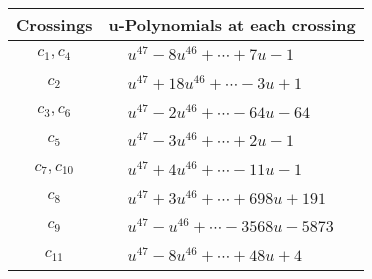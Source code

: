 \documentclass[1p]{elsarticle_modified}
\theoremstyle{definition}
\begin{document}
\begin{tabular}{m{50pt}|m{274pt}}
Crossings & \hspace{64pt}u-Polynomials at each crossing \\
\hline $$\begin{aligned}c_{1},c_{4}\end{aligned}$$&$\begin{aligned}
&u^{47}-8 u^{46}+\cdots+7 u-1
\end{aligned}$\\
\hline $$\begin{aligned}c_{2}\end{aligned}$$&$\begin{aligned}
&u^{47}+18 u^{46}+\cdots-3 u+1
\end{aligned}$\\
\hline $$\begin{aligned}c_{3},c_{6}\end{aligned}$$&$\begin{aligned}
&u^{47}-2 u^{46}+\cdots-64 u-64
\end{aligned}$\\
\hline $$\begin{aligned}c_{5}\end{aligned}$$&$\begin{aligned}
&u^{47}-3 u^{46}+\cdots+2 u-1
\end{aligned}$\\
\hline $$\begin{aligned}c_{7},c_{10}\end{aligned}$$&$\begin{aligned}
&u^{47}+4 u^{46}+\cdots-11 u-1
\end{aligned}$\\
\hline $$\begin{aligned}c_{8}\end{aligned}$$&$\begin{aligned}
&u^{47}+3 u^{46}+\cdots+698 u+191
\end{aligned}$\\
\hline $$\begin{aligned}c_{9}\end{aligned}$$&$\begin{aligned}
&u^{47}- u^{46}+\cdots-3568 u-5873
\end{aligned}$\\
\hline $$\begin{aligned}c_{11}\end{aligned}$$&$\begin{aligned}
&u^{47}-8 u^{46}+\cdots+48 u+4
\end{aligned}$\\
\hline
\end{tabular}\\~\\
\end{document}
